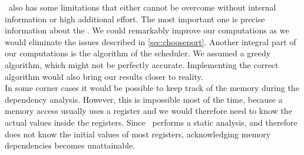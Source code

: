\suaca\ also has some limitations that either cannot be overcome without internal information or high additional effort.
The most important one is precise information about the \microops. We could remarkably improve our computations as we would eliminate the issues described in \autoref{sec:chooseport}. Another integral part of our computations is the algorithm of the scheduler. We assumed a greedy algorithm, which might not be perfectly accurate. Implementing the correct algorithm would also bring our results closer to reality.\\
In some corner cases it would be possible to keep track of the memory during the dependency analysis. However, this is impossible most of the time, because a memory access usually uses a register and we would therefore need to know the actual values inside the registers. Since \suaca\ performs a static analysis, and therefore does not know the initial values of most registers, acknowledging memory dependencies becomes unattainable.\\

